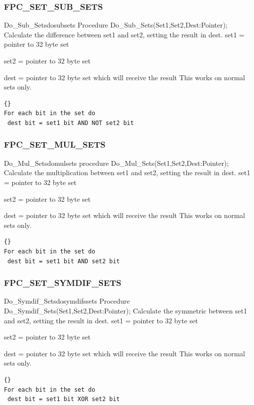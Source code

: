 \documentclass [a4paper,12pt]{article}
\begin{document}
\subsubsection{FPC{\_}SET{\_}SUB{\_}SETS}
\label{subsubsec:mylabel91}

\begin{procedurel}{Do{\_}Sub{\_}Sets}{dosubsets}
\Declaration
Procedure Do{\_}Sub{\_}Sets(Set1,Set2,Dest:Pointer);
\Description
Calculate the difference between \textsf{set1} and \textsf{set2}, setting
the result in \textsf{dest}.
\Parameters
set1 = pointer to 32 byte set \par
set2 = pointer to 32 byte set \par
dest = pointer to 32 byte set which will receive the result
\Notes
This works on normal sets only. 
\Algorithm
\begin{lstlisting}{}
For each bit in the set do
 dest bit = set1 bit AND NOT set2 bit
\end{lstlisting}
\end{procedurel}

\subsubsection{FPC{\_}SET{\_}MUL{\_}SETS}
\label{subsubsec:mylabel92}

\begin{procedurel}{Do{\_}Mul{\_}Sets}{domulsets}
\Declaration
procedure Do{\_}Mul{\_}Sets(Set1,Set2,Dest:Pointer);
\Description
Calculate the multiplication between \textsf{set1} and \textsf{set2},
setting the result in \textsf{dest}.
\Parameters
set1 = pointer to 32 byte set \par
set2 = pointer to 32 byte set \par
dest = pointer to 32 byte set which will receive the result
\Notes
This works on normal sets only.
\Algorithm
\begin{lstlisting}{}
For each bit in the set do
 dest bit = set1 bit AND set2 bit
\end{lstlisting}
\end{procedurel}

\subsubsection{FPC{\_}SET{\_}SYMDIF{\_}SETS}
\label{subsubsec:mylabel93}

\begin{procedurel}{Do{\_}Symdif{\_}Sets}{dosymdifssets}
\Declaration
Procedure Do{\_}Symdif{\_}Sets(Set1,Set2,Dest:Pointer);
\Description
Calculate the symmetric between \textsf{set1} and \textsf{set2}, setting the
result in \textsf{dest}.
\Parameters
set1 = pointer to 32 byte set \par
set2 = pointer to 32 byte set \par
dest = pointer to 32 byte set which will receive the result
\Notes
This works on normal sets only.
\Algorithm
\begin{lstlisting}{}
For each bit in the set do
 dest bit = set1 bit XOR set2 bit
\end{lstlisting}
\end{procedurel}
\end{document}
